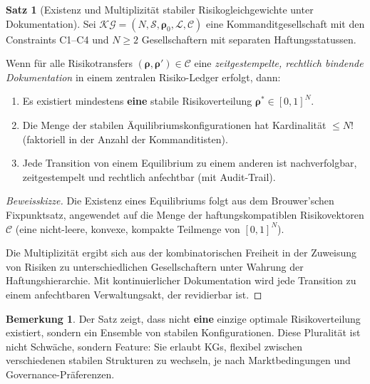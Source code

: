 \documentclass[a4paper, 12pt, twoside, openright]{report}
\theoremstyle{definition}
\theoremstyle{definition}
\newtheorem{satz}{Satz}[chapter]
\newtheorem{bemerkung}{Bemerkung}[chapter]
\begin{document}
\begin{satz}[Existenz und Multiplizität stabiler Risikogleichgewichte unter Dokumentation]
\label{satz:risikoequilibrium}
Sei $\mathcal{KG} = (N, \mathcal{S}, \boldsymbol{\rho}_0, \mathcal{L}, \mathcal{C})$ eine Kommanditgesellschaft mit den Constraints C1--C4 und $N \geq 2$ Gesellschaftern mit separaten Haftungsstatussen. 

Wenn für alle Risikotransfers $({\boldsymbol{\rho}}, {\boldsymbol{\rho}}') \in \mathcal{C}$ eine \emph{zeitgestempelte, rechtlich bindende Dokumentation} in einem zentralen Risiko-Ledger erfolgt, dann:

\begin{enumerate}
    \item Es existiert mindestens \textbf{eine} stabile Risikoverteilung $\boldsymbol{\rho}^* \in [0,1]^N$.
    
    \item Die Menge der stabilen Äquilibriumskonfigurationen hat Kardinalität $\leq N!$ (faktoriell in der Anzahl der Kommanditisten).
    
    \item Jede Transition von einem Equilibrium zu einem anderen ist nachverfolgbar, zeitgestempelt und rechtlich anfechtbar (mit Audit-Trail).
\end{enumerate}
\end{satz}

\begin{proof}[Beweisskizze]
Die Existenz eines Equilibriums folgt aus dem Brouwer'schen Fixpunktsatz, angewendet auf die Menge der haftungskompatiblen Risikovektoren $\mathcal{C}$ (eine nicht-leere, konvexe, kompakte Teilmenge von $[0,1]^N$). 

Die Multiplizität ergibt sich aus der kombinatorischen Freiheit in der Zuweisung von Risiken zu unterschiedlichen Gesellschaftern unter Wahrung der Haftungshierarchie. Mit kontinuierlicher Dokumentation wird jede Transition zu einem anfechtbaren Verwaltungsakt, der revidierbar ist.
\end{proof}

\begin{bemerkung}
Der Satz zeigt, dass nicht \textbf{eine} einzige optimale Risikoverteilung existiert, sondern ein Ensemble von stabilen Konfigurationen. Diese Pluralität ist nicht Schwäche, sondern Feature: Sie erlaubt KGs, flexibel zwischen verschiedenen stabilen Strukturen zu wechseln, je nach Marktbedingungen und Governance-Präferenzen.
\end{bemerkung}
\end{document}
